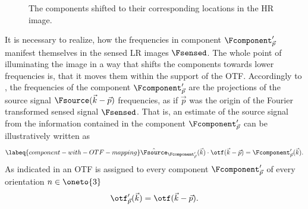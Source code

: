 %
\begin{figure}
    \caption{The components shifted to their corresponding locations in the \ac{HR} image.}
\end{figure}
%

It is necessary to realize, how the frequencies in component \(\Fcomponent'_{\vec{p}}\) manifest themselves in the
    sensed \ac{LR} images \(\Fsensed\).
The whole point of illuminating the image in a way that shifts the components towards lower frequencies is, that it
    moves them within the support of the \ac{OTF}.
Accordingly to , the frequencies of the component \(\Fcomponent'_{\vec{p}}\) are the
    projections of the source signal \(\Fsource(\vec{k} - \vec{p})\) frequencies, as if \(\vec{p}\) was the origin of
    the Fourier transformed sensed signal \(\Fsensed\).
That is, an estimate of the source signal from the information contained in the component \(\Fcomponent'_{\vec{p}}\) can
    be illustratively written as
    \begin{equation}
        \labeq{component-with-OTF-mapping}
        \hat{\Fsource}_{\Fcomponent'_{\vec{p}}}(\vec{k}) \cdot \otf(\vec{k} - \vec{p})
        = \Fcomponent'_{\vec{p}}(\vec{k}).
    \end{equation}
As indicated in  an \ac{OTF} is assigned to every component \(\Fcomponent'_{\vec{p}}\) of every orientation \(n \in \oneto{3}\)
    \begin{equation*}
        \otf'_{\vec{p}}(\vec{k}) = \otf(\vec{k} - \vec{p}).
    \end{equation*}


